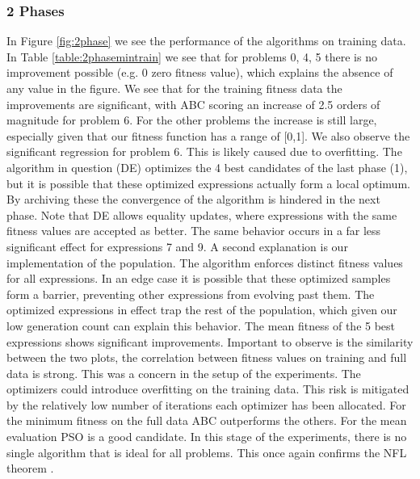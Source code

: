 \subsubsection{2 Phases}
In Figure \ref{fig:2phase} we see the performance of the algorithms on training data. 
In Table \ref{table:2phasemintrain} we see that for problems 0, 4, 5 there is no improvement possible (e.g. 0 zero fitness value), which explains the absence of any value in the figure.
We see that for the training fitness data the improvements are significant, with ABC scoring an increase of 2.5 orders of magnitude for problem 6. For the other problems the increase is still large, especially given that our fitness function has a range of [0,1].
We also observe the significant regression for problem 6. This is likely caused due to overfitting. The algorithm in question (DE) optimizes the 4 best candidates of the last phase (1), but it is possible that these optimized expressions actually form a local optimum. By archiving these the convergence of the algorithm is hindered in the next phase. Note that DE allows equality updates, where expressions with the same fitness values are accepted as better. The same behavior occurs in a far less significant effect for expressions 7 and 9. A second explanation is our implementation of the population. The algorithm enforces distinct fitness values for all expressions. In an edge case it is possible that these optimized samples form a barrier, preventing other expressions from evolving past them. The optimized expressions in effect trap the rest of the population, which given our low generation count can explain this behavior.
The mean fitness of the 5 best expressions shows significant improvements. Important to observe is the similarity between the two plots, the correlation between fitness values on training and full data is strong. This was a concern in the setup of the experiments. The optimizers could introduce overfitting on the training data. This risk is mitigated by the relatively low number of iterations each optimizer has been allocated.
For the minimum fitness on the full data ABC outperforms the others. For the mean evaluation PSO is a good candidate. In this stage of the experiments, there is no single algorithm that is ideal for all problems. This once again confirms the NFL theorem \cite{NFL}.

